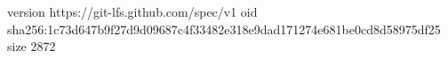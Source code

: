 version https://git-lfs.github.com/spec/v1
oid sha256:1c73d647b9f27d9d09687c4f33482e318e9dad171274e681be0cd8d58975df25
size 2872
